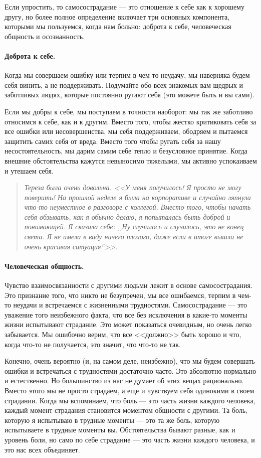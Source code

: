 Если упростить, то самосострадание --- это отношение к себе как к хорошему другу, но более полное определение включает три основных компонента, которыми мы пользуемся, когда нам больно: доброта к себе, человеческая общность и осознанность.

\paragraph{Доброта к себе.} 
Когда мы совершаем ошибку или терпим в чем-то неудачу, мы наверняка будем себя винить, а не поддерживать. Подумайте обо всех знакомых вам щедрых и заботливых людях, которые постоянно ругают себя (это можете быть и вы сами). 

Если мы добры к себе, мы поступаем в точности наоборот: мы так же заботливо относимся к себе, как и к другим. Вместо того, чтобы жестко критиковать себя за все ошибки или несовершенства, мы себя поддерживаем, ободряем и пытаемся защитить самих себя от вреда. Вместо того чтобы ругать себя за нашу несостоятельность, мы дарим самим себе тепло и безусловное принятие. Когда внешние обстоятельства кажутся невыносимо тяжелыми, мы активно успокаиваем и утешаем себя. 

\begin{quote}
	\textit{Тереза была очень довольна. <<У меня получилось! Я просто не могу поверить! На прошлой неделе я была на корпоративе и случайно ляпнула  что-то неуместное в разговоре с коллегой. Вместо того, чтобы начать себя обзывать, как я обычно делаю, я попыталась быть доброй и понимающей. Я сказала себе: ,,Ну случилось и случилось, это не конец света. Я не имела в виду ничего плохого, даже если в итоге вышла не очень красивая ситуация``>>.}
\end{quote}

\paragraph{Человеческая общность.}
 Чувство взаимосвязанности с другими людьми лежит в основе самосострадания. Это признание того, что никто не безупречен, мы все ошибаемся, терпим в чем-то неудачи и встречаемся с жизненными трудностями. Самосострадание --- это уважение того неизбежного факта, что все без исключения в какие-то моменты жизни испытывают страдание. Это может показаться очевидным, но очень легко забывается. Мы ошибочно верим, что все <<должно>> быть хорошо и что, когда что-то не получается, это значит, что что-то не так. 

Конечно, очень вероятно (и, на самом деле, неизбежно), что мы будем совершать ошибки и встречаться с трудностями достаточно часто. Это абсолютно нормально и естественно. Но большинство из нас не думает об этих вещах рационально. Вместо этого мы не просто страдаем, а еще и чувствуем себя одинокими в своем страдании. Когда мы вспоминаем, что боль --- это часть жизни каждого человека, каждый момент страдания становится моментом общности с другими. Та боль, которую я испытываю в трудные моменты --- это та же боль, которую испытываете в трудные моменты вы. Обстоятельства бывают разные, как и уровень боли, но само по себе страдание --- это часть жизни каждого человека, и это нас всех объединяет. 


